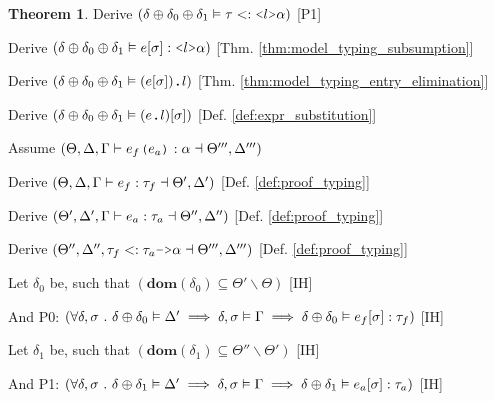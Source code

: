 \documentclass[acmsmall]{acmart}
\theoremstyle{definition}
\newtheorem{theorem}{Theorem}[section]
\begin{document}
\begin{theorem}
  \item \I\I \N Derive $(
    \delta \oplus \delta_0 \oplus \delta_1 \satisfies \tau \subtypes \J{<} l \J{>} \alpha
  )$ [P1]

  \item \I\I \N Derive $(
    \delta \oplus \delta_0 \oplus \delta_1 \satisfies e[\sigma] \hastype \J{<}l\J{>}\alpha
  )$ [Thm. \ref{thm:model_typing_subsumption}]

  \item \I\I \N Derive $(
    \delta \oplus \delta_0 \oplus \delta_1 \satisfies (e[\sigma])\J{.}l
  )$ [Thm. \ref{thm:model_typing_entry_elimination}]

  \item \I\I \N Derive $(
    \delta \oplus \delta_0 \oplus \delta_1 \satisfies (e\J{.}l)[\sigma]
  )$ [Def. \ref{def:expr_substitution}]

  \item \N Assume $(
    \Theta, \Delta, \Gamma \entails e_f \J{(} e_a \J{)} \hastype \alpha \given \Theta''', \Delta'''
  )$
  \item \I \N Derive $(
    \Theta, \Delta, \Gamma \vdash e_f : \tau_f \dashv \Theta', \Delta'
  )$ [Def. \ref{def:proof_typing}]
  \item \I \N Derive $(
    \Theta', \Delta', \Gamma \vdash e_a : \tau_a \dashv \Theta'', \Delta''
  )$ [Def. \ref{def:proof_typing}]
  \item \I \N Derive $(
    \Theta'', \Delta'', \tau_f \subtypes \tau_a\J{->}\alpha \given \Theta''', \Delta'''
  )$ [Def. \ref{def:proof_typing}]

  \item \I \N Let $\delta_0$ be, such that $(
    \textbf{dom}(\delta_0) \subseteq \Theta' \backslash \Theta
  )$ [IH]
  \item \I \N And P0: $(
    \forall \delta, \sigma \ .\  
    \delta \oplus \delta_0 \vDash \Delta' \implies
    \delta, \sigma \vDash \Gamma \implies
    \delta \oplus \delta_0 \vDash e_f[\sigma] : \tau_f
  )$ [IH]

  \item \I \N Let $\delta_1$ be, such that $(
    \textbf{dom}(\delta_1) \subseteq \Theta'' \backslash \Theta'
  )$ [IH]
  \item \I \N And P1: $(
    \forall \delta, \sigma \ .\  
    \delta \oplus \delta_1 \vDash \Delta' \implies
    \delta, \sigma \vDash \Gamma \implies
    \delta \oplus \delta_1 \vDash e_a[\sigma] : \tau_a
  )$ [IH]


\end{theorem}
\end{document}
